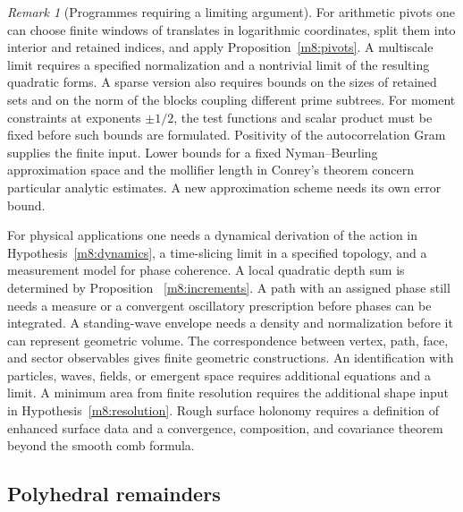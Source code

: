 \documentclass[11pt,reqno]{amsart}
\theoremstyle{definition}
\theoremstyle{remark}
\newtheorem{remark}[theorem]{Remark}
\numberwithin{equation}{section}
\begin{document}
\begin{remark}[Programmes requiring a limiting argument]\label{m8:programmes}
For arithmetic pivots one can choose finite windows of translates
in logarithmic coordinates, split them into interior and retained
indices, and apply Proposition~\ref{m8:pivots}. A multiscale limit
requires a specified normalization and a nontrivial limit of the
resulting quadratic forms. A sparse version also requires bounds
on the sizes of retained sets and on the norm of the blocks coupling
different prime subtrees. For moment constraints at exponents
$\pm1/2$, the test functions and scalar product must be fixed before
such bounds are formulated. Positivity of the autocorrelation
Gram supplies the finite input. Lower bounds for a fixed
Nyman--Beurling approximation space \cite{m8:burnol} and the
mollifier length in Conrey's theorem \cite{m8:conrey} concern
particular analytic estimates. A new approximation scheme needs
its own error bound.

For physical applications one needs a dynamical derivation of the
action in Hypothesis~\ref{m8:dynamics}, a time-slicing limit in a
specified topology, and a measurement model for phase coherence.
A local quadratic depth sum is determined by Proposition~
\ref{m8:increments}. A path with an assigned phase still needs a
measure or a convergent oscillatory prescription before phases can
be integrated. A standing-wave envelope needs a density and
normalization before it can represent geometric volume. The
correspondence between vertex, path, face, and sector observables
gives finite geometric constructions. An identification with
particles, waves, fields, or emergent space requires additional
equations and a limit. A minimum area from finite resolution requires the
additional shape input in Hypothesis~\ref{m8:resolution}.
Rough surface holonomy requires a definition of enhanced
surface data and a convergence, composition, and covariance
theorem beyond the smooth comb formula.
\end{remark}

\subsection{Polyhedral remainders}
\end{document}
